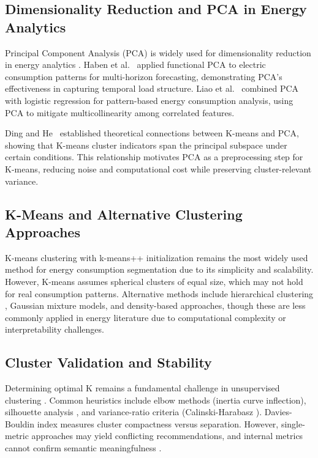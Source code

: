 \documentclass[11pt,a4paper]{article}
\begin{document}
\subsection{Dimensionality Reduction and PCA in Energy Analytics}

Principal Component Analysis (PCA) is widely used for dimensionality reduction in energy analytics \cite{jolliffe2002pca}. Haben et al.~\cite{haben2019fpca} applied functional PCA to electric consumption patterns for multi-horizon forecasting, demonstrating PCA's effectiveness in capturing temporal load structure. Liao et al.~\cite{liao2016pattern} combined PCA with logistic regression for pattern-based energy consumption analysis, using PCA to mitigate multicollinearity among correlated features.

Ding and He~\cite{ding2004kmeans} established theoretical connections between K-means and PCA, showing that K-means cluster indicators span the principal subspace under certain conditions. This relationship motivates PCA as a preprocessing step for K-means, reducing noise and computational cost while preserving cluster-relevant variance.

\subsection{K-Means and Alternative Clustering Approaches}

K-means clustering \cite{lloyd1982least} with k-means++ initialization \cite{arthur2007kmeans} remains the most widely used method for energy consumption segmentation due to its simplicity and scalability. However, K-means assumes spherical clusters of equal size, which may not hold for real consumption patterns. Alternative methods include hierarchical clustering \cite{rhodes2014clustering}, Gaussian mixture models, and density-based approaches, though these are less commonly applied in energy literature due to computational complexity or interpretability challenges.

\subsection{Cluster Validation and Stability}

Determining optimal K remains a fundamental challenge in unsupervised clustering \cite{hennig2020comparing}. Common heuristics include elbow methods (inertia curve inflection), silhouette analysis \cite{rousseeuw1987silhouettes}, and variance-ratio criteria (Calinski-Harabasz \cite{calinski1974dendrite}). Davies-Bouldin index \cite{davies1979cluster} measures cluster compactness versus separation. However, single-metric approaches may yield conflicting recommendations, and internal metrics cannot confirm semantic meaningfulness \cite{gates2019adjusted}.
\end{document}
